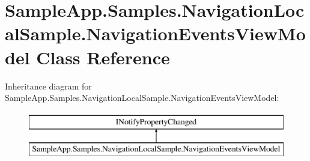 \hypertarget{class_sample_app_1_1_samples_1_1_navigation_local_sample_1_1_navigation_events_view_model}{}\section{Sample\+App.\+Samples.\+Navigation\+Local\+Sample.\+Navigation\+Events\+View\+Model Class Reference}
\label{class_sample_app_1_1_samples_1_1_navigation_local_sample_1_1_navigation_events_view_model}
Inheritance diagram for Sample\+App.\+Samples.\+Navigation\+Local\+Sample.\+Navigation\+Events\+View\+Model\+:\begin{figure}[H]
\begin{center}
\leavevmode
\includegraphics[height=2.000000cm]{class_sample_app_1_1_samples_1_1_navigation_local_sample_1_1_navigation_events_view_model}
\end{center}
\end{figure}
